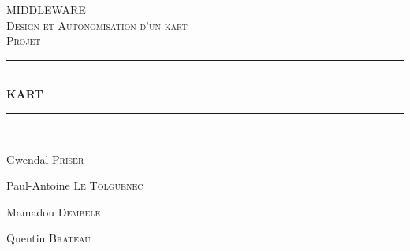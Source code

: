 \documentclass[12pt]{article}
\begin{document}
\begin{titlepage}
\newcommand{\HRule}{\rule{\linewidth}{0.1mm}} 
\center %
 
\textsc{\Large MIDDLEWARE}\\[0.5cm] %
\textsc{\Large Design et Autonomisation d'un kart }\\[0.5cm] %
\textsc{\large Projet }\\[0.5cm] %

\HRule \\[0.4cm]
{ \huge \bfseries KART}\\[0.1cm] %
\HRule \\[1.5cm]
 

\begin{minipage}{0.4\textwidth}
\begin{flushleft} \large
Gwendal \textsc{Priser}\\  %
\end{flushleft}

\begin{flushleft} \large
    Paul-Antoine \textsc{Le Tolguenec}\\  %
    \end{flushleft}
    \begin{flushleft} \large
        Mamadou \textsc{Dembele}\\  %
        \end{flushleft}
\end{minipage}
\begin{minipage}{0.4\textwidth}
    \begin{flushleft} \large
        Quentin \textsc{Brateau}\\  %
        \end{flushleft}


\end{minipage}
\end{titlepage}
\end{document}
